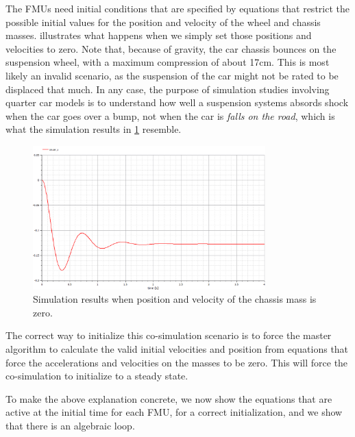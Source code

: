 The FMUs need initial conditions that are specified by equations that restrict the possible initial values for the position and velocity of the wheel and chassis masses.
 illustrates what happens when we simply set those positions and velocities to zero.
Note that, because of gravity, the car chassis bounces on the suspension wheel, with a maximum compression of about 17cm. This is most likely an invalid scenario, as the suspension of the car might not be rated to be displaced that much. In any case, the purpose of simulation studies involving quarter car models is to understand how well a suspension systems absords shock when the car goes over a bump, not when the car is \emph{falls on the road}, which is what the simulation results in \cref{fig:init_state_0_sim} resemble.

\begin{figure}[htb]
    \centering
    \includegraphics[width=0.8\textwidth]{images/init_state_0_sim.png}
    \caption{Simulation results when position and velocity of the chassis mass is zero. }
    \label{fig:init_state_0_sim}
\end{figure}

The correct way to initialize this co-simulation scenario is to force the master algorithm to calculate the valid initial velocities and position from equations that force the accelerations and velocities on the masses to be zero.
This will force the co-simulation to initialize to a steady state.

To make the above explanation concrete, we now show the equations that are active at the initial time for each FMU, for a correct initialization, and we show that there is an algebraic loop.

